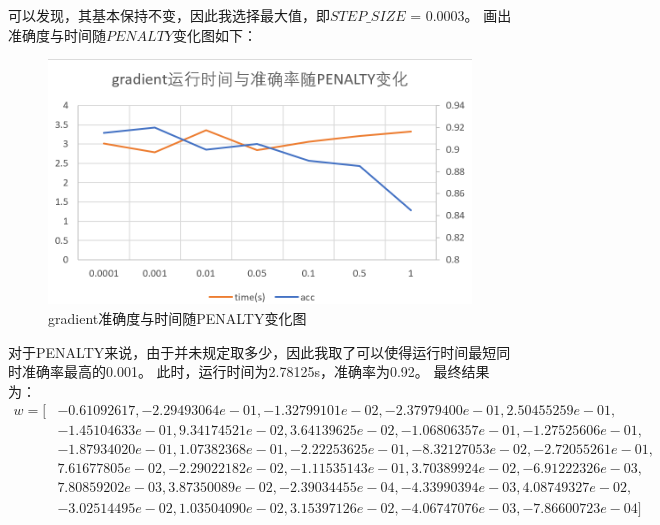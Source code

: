 \documentclass[UTF8]{ctexart}
\begin{document}
可以发现，其基本保持不变，因此我选择最大值，即$STEP\_SIZE$ = 0.0003。
画出准确度与时间随$PENALTY$变化图如下：
\begin{figure}[H]
    \centering
    \includegraphics[scale=0.8]{./img/gradient_penalty.png}
    \caption{gradient准确度与时间随PENALTY变化图}
\end{figure}
对于PENALTY来说，由于并未规定取多少，因此我取了可以使得运行时间最短同时准确率最高的0.001。
此时，运行时间为2.78125s，准确率为0.92。
最终结果为：
\begin{align}
    w=[&-0.61092617,-2.29493064e-01,-1.32799101e-02,-2.37979400e-01,2.50455259e-01,\nonumber\\
    &-1.45104633e-01,9.34174521e-02,3.64139625e-02,-1.06806357e-01,-1.27525606e-01,\nonumber\\
    &-1.87934020e-01,1.07382368e-01,-2.22253625e-01,-8.32127053e-02,-2.72055261e-01,\nonumber\\
    &7.61677805e-02,-2.29022182e-02,-1.11535143e-01,3.70389924e-02,-6.91222326e-03,\nonumber\\
    &7.80859202e-03,3.87350089e-02,-2.39034455e-04,-4.33990394e-03,4.08749327e-02,\nonumber\\
    &-3.02514495e-02,1.03504090e-02,3.15397126e-02,-4.06747076e-03,-7.86600723e-04]\nonumber
\end{align}
\end{document}
